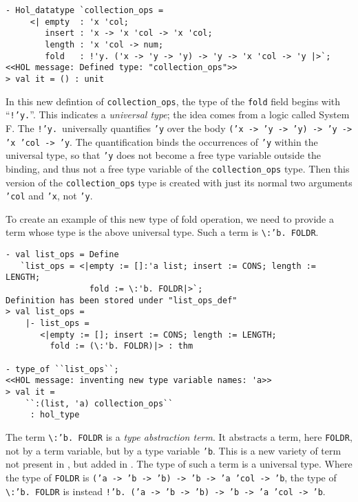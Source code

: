 \begin{session}
\begin{verbatim}
- Hol_datatype `collection_ops =
     <| empty  : 'x 'col;
        insert : 'x -> 'x 'col -> 'x 'col;
        length : 'x 'col -> num;
        fold   : !'y. ('x -> 'y -> 'y) -> 'y -> 'x 'col -> 'y |>`;
<<HOL message: Defined type: "collection_ops">>
> val it = () : unit
\end{verbatim}
\end{session}

In this new defintion of \texttt{collection\_ops}, the type of the \texttt{fold} field
begins with ``\texttt{!'y.}''. This indicates a {\it universal type};
the idea comes from a logic called System F. The \texttt{!'y.}~universally quantifies
\texttt{'y} over the body \texttt{\small ('x -> 'y -> 'y) -> 'y -> 'x 'col -> 'y}.
The quantification binds the occurrences
of \texttt{'y} within the universal type, so that \texttt{'y} does not become a free
type variable outside the binding, and thus not a free type variable of the
\texttt{collection\_ops} type.  Then this version of the \texttt{collection\_ops}
type is created with just its normal two arguments \texttt{'col} and
\texttt{'x}, not \texttt{'y}.

To create an example of this new type of fold operation, we need to provide a term
whose type is the above universal type.
Such a term is \verb|\|\texttt{:'b.~FOLDR}.
\begin{session}
\begin{verbatim}
- val list_ops = Define
   `list_ops = <|empty := []:'a list; insert := CONS; length := LENGTH;
                 fold := \:'b. FOLDR|>`;
Definition has been stored under "list_ops_def"
> val list_ops =
    |- list_ops =
       <|empty := []; insert := CONS; length := LENGTH;
         fold := (\:'b. FOLDR)|> : thm

- type_of ``list_ops``;
<<HOL message: inventing new type variable names: 'a>>
> val it =
    ``:(list, 'a) collection_ops``
     : hol_type
\end{verbatim}
\end{session}

The term \verb|\|\texttt{:'b.~FOLDR} is a {\it type abstraction term}. It abstracts
a term, here \texttt{FOLDR}, not by a term variable, but by a type variable \texttt{'b}.
This is a new variety of term not present in \HOL{},
but added in \HOLW{}.
The type of such a term is
a universal type.  Where the type of \texttt{FOLDR} is
\texttt{('a~->~'b~->~'b) -> 'b -> 'a 'col -> 'b},
the type of \verb|\|\texttt{:'b.~FOLDR} is instead
\texttt{!'b.~('a~->~'b~->~'b) -> 'b -> 'a 'col -> 'b}.

